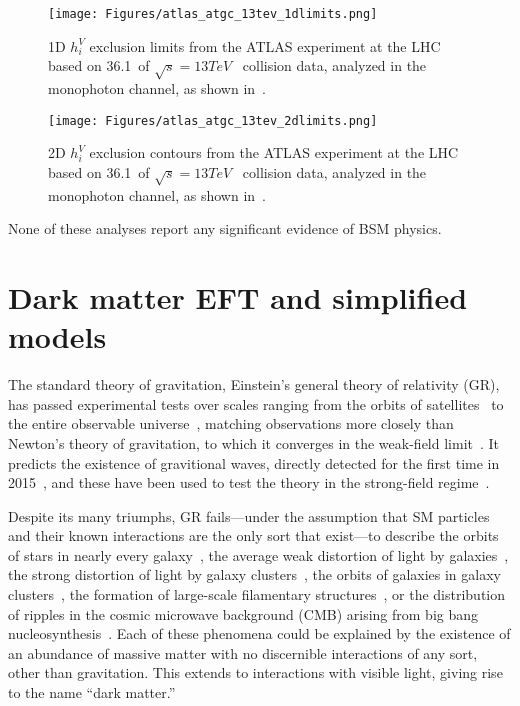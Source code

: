 \begin{figure}[hbtp]
  \begin{center}
    \texttt{[image: Figures/atlas\_atgc\_13tev\_1dlimits.png]}
    \caption{
      1D $h_{i}^{V}$ exclusion limits from the ATLAS experiment at the LHC based on 36.1\fbinv\ of $\sqrt{s} = 13\unit{TeV}$
      \Pp\Pp\ collision data, analyzed in the monophoton channel, as shown in~\cite{ref:CERN-EP-2018-220}.
    }
    \label{fig:atlas_atgc_13tev_1dlimits}
  \end{center}
\end{figure}

\begin{figure}[hbtp]
  \begin{center}
    \texttt{[image: Figures/atlas\_atgc\_13tev\_2dlimits.png]}
    \caption{
      2D $h_{i}^{V}$ exclusion contours from the ATLAS experiment at the LHC based on 36.1\fbinv\ of $\sqrt{s} = 13\unit{TeV}$
      \Pp\Pp\ collision data, analyzed in the monophoton channel, as shown in~\cite{ref:CERN-EP-2018-220}.
    }
    \label{fig:atlas_atgc_13tev_2dlimits}
  \end{center}
\end{figure}

None of these analyses report any significant evidence of BSM physics.

\section{Dark matter EFT and simplified models} \label{sec:introduction_dm}
The standard theory of gravitation, Einstein's
general theory of relativity (GR), has passed experimental tests over scales ranging from the orbits of satellites~\cite{ref:lrr-2003-1} to the entire observable universe~\cite{ref:planck2018_cosparams},
matching observations more closely than Newton's theory of gravitation, to which it converges in the weak-field limit~\cite{ref:WaldGR}.
It predicts the existence of gravitional waves, directly detected for the first time in 2015~\cite{ref:PhysRevLett.116.061102}, and these have been used to test the theory in the strong-field regime~\cite{ref:PhysRevLett.116.221101}.

Despite its many triumphs, GR fails---under the assumption that SM particles and their known interactions are the only sort that exist---to describe the orbits of stars in nearly every galaxy~\cite{ref:nature25767},
the average weak distortion of light by galaxies~\cite{ref:weaklensing}, the strong distortion of light by galaxy clusters~\cite{ref:mnras/stw3385}, the orbits of galaxies in galaxy clusters~\cite{ref:annurev-astro-081710-102514},
the formation of large-scale filamentary structures~\cite{ref:nature03597}, or the distribution of ripples in the cosmic microwave background (CMB) arising from big bang nucleosynthesis~\cite{ref:planck2018_cosparams}.
Each of these phenomena could be explained by the existence of an abundance of massive matter with no discernible interactions of any sort, other than gravitation.
This extends to interactions with visible light, giving rise to the name ``dark matter.''

